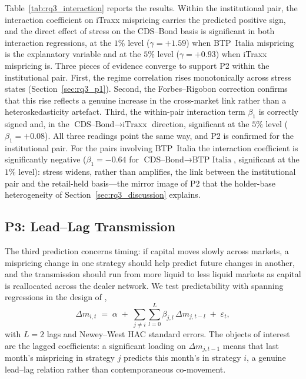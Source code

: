 Table~\ref{tab:rq3_interaction} reports the results. Within the
institutional pair, the interaction coefficient on iTraxx mispricing
carries the predicted positive sign, and the direct effect of stress
on the CDS--Bond basis is significant in both interaction regressions,
at the $1\%$ level ($\gamma = +1.59$) when BTP~Italia mispricing
is the explanatory variable and at the $5\%$ level
($\gamma = +0.93$) when iTraxx mispricing is. Three pieces of evidence converge to support P2 within the
institutional pair. First, the regime correlation rises monotonically
across stress states (Section~\ref{sec:rq3_p1}). Second, the
Forbes--Rigobon correction confirms that this rise reflects a genuine
increase in the cross-market link rather than a heteroskedasticity
artefact. Third, the within-pair interaction term $\beta_1$ is
correctly signed and, in the
$\textrm{CDS--Bond}\rightarrow\textrm{iTraxx}$ direction, significant
at the $5\%$ level ($\beta_1 = +0.08$). All three readings point
the same way, and P2 is confirmed for the institutional pair. For the pairs involving BTP~Italia the interaction coefficient
is significantly negative ($\beta_{1} = -0.64$ for $\textrm{CDS--Bond}
\rightarrow \textrm{BTP~Italia}$, significant at the $1\%$
level): stress widens, rather than amplifies, the link between the
institutional pair and the retail-held basis---the mirror image of P2
that the holder-base heterogeneity of
Section~\ref{sec:rq3_discussion} explains.


\subsection{P3: Lead--Lag Transmission}
\label{sec:rq3_p3}

The third prediction concerns timing: if capital moves slowly across
markets, a mispricing change in one strategy should help predict
future changes in another, and the transmission should run from more
liquid to less liquid markets as capital is reallocated across the
dealer network. We test predictability with spanning regressions in
the design of \citet{fleckenstein2014tips},
\begin{equation}\label{eq:spanning}
  \Delta m_{i,t} \;=\; \alpha
  \;+\; \sum_{j \neq i} \sum_{l=0}^{L} \beta_{j,l}\, \Delta m_{j,t-l}
  \;+\; \varepsilon_t,
\end{equation}
with $L = 2$ lags and Newey--West HAC standard errors. The objects of
interest are the lagged coefficients: a significant loading on
$\Delta m_{j,t-1}$ means that last month's mispricing in strategy $j$
predicts this month's in strategy $i$, a genuine lead--lag relation
rather than contemporaneous co-movement.

